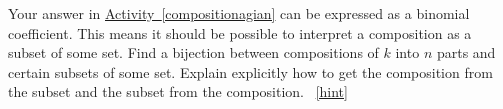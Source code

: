 \documentclass{book}
\begin{document}
\setcounter{project}{129}
\addtocounter{project}{-1}
\begin{activity}[]\label{activity-122}
\hypertarget{p-917}{}%
Your answer in \hyperref[compositionagian]{Activity~\ref{compositionagian}} can be expressed as a binomial coefficient. This means it should be possible to interpret a composition as a subset of some set. Find a bijection between compositions of \(k\) into \(n\) parts and certain subsets of some set.  Explain explicitly how to get the composition from the subset and the subset from the composition.%
~\hfill{\tiny\hyperlink{a-129}{[hint]}\hypertarget{q-129}{}}\end{activity}
\end{document}
